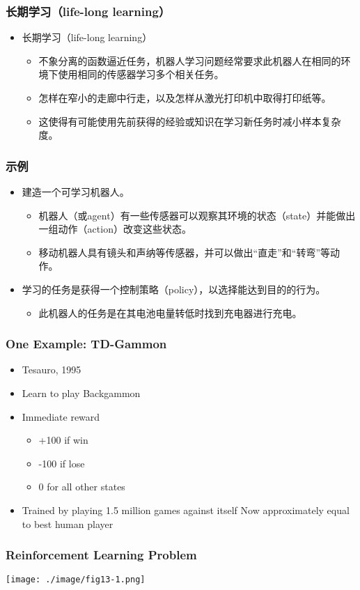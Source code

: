 \documentclass{beamer}
\begin{document}
\begin{frame}
\frametitle{长期学习（life-long learning）}
\label{sec-1-6}

\begin{itemize}
\item 长期学习（life-long learning）
\begin{itemize}
\item 不象分离的函数逼近任务，机器人学习问题经常要求此机器人在相同的环境下使用相同的传感器学习多个相关任务。
\item 怎样在窄小的走廊中行走，以及怎样从激光打印机中取得打印纸等。
\item 这使得有可能使用先前获得的经验或知识在学习新任务时减小样本复杂度。
\end{itemize}
\end{itemize}
\end{frame}
\begin{frame}
\frametitle{示例}
\label{sec-1-7}

\begin{itemize}
\item 建造一个可学习机器人。
\begin{itemize}
\item 机器人（或agent）有一些传感器可以观察其环境的状态（state）并能做出一组动作（action）改变这些状态。
\item 移动机器人具有镜头和声纳等传感器，并可以做出“直走”和“转弯”等动作。
\end{itemize}
\item 学习的任务是获得一个控制策略（policy），以选择能达到目的的行为。
\begin{itemize}
\item 此机器人的任务是在其电池电量转低时找到充电器进行充电。
\end{itemize}
\end{itemize}
\end{frame}
\begin{frame}
\frametitle{One Example: TD-Gammon}
\label{sec-1-8}


\begin{itemize}
\item Tesauro, 1995
\item Learn to play Backgammon
\item Immediate reward
\begin{itemize}
\item +100 if win
\item -100 if lose
\item 0 for all other states
\end{itemize}
\item Trained by playing 1.5 million games against itself
  Now approximately equal to best human player
\end{itemize}
\end{frame}
\begin{frame}
\frametitle{Reinforcement Learning Problem}
\label{sec-1-9}


\center
\texttt{[image: ./image/fig13-1.png]}
\end{frame}
\end{document}
